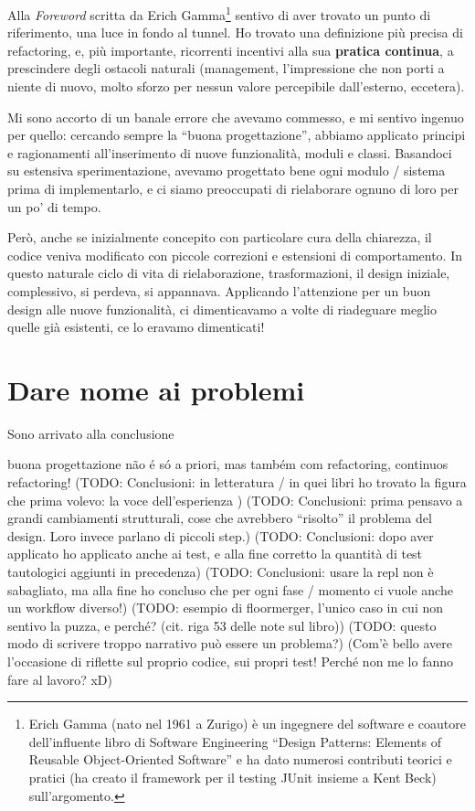 \documentclass[12pt]{report}
\begin{document}
Alla \textit{Foreword} scritta da Erich Gamma\footnote{
Erich Gamma (nato nel 1961 a Zurigo) è un ingegnere del software e
coautore dell'influente libro di Software Engineering ``Design Patterns: 
Elements of Reusable Object-Oriented Software'' e ha dato numerosi contributi
teorici e pratici (ha creato il framework per il testing JUnit insieme
a Kent Beck) sull'argomento.}
sentivo di aver trovato un punto di 
riferimento, una luce in fondo al tunnel. Ho trovato una definizione più precisa
di refactoring, e, più importante, ricorrenti incentivi alla sua 
\textbf{pratica continua}, a prescindere degli ostacoli naturali (management, 
l'impressione che non porti a niente di nuovo, molto sforzo per nessun valore
percepibile dall'esterno, eccetera).

Mi sono accorto di un banale errore che avevamo commesso, e mi 
sentivo ingenuo per quello: cercando sempre la ``buona progettazione'', 
abbiamo applicato principi e ragionamenti all'inserimento di nuove 
funzionalità, moduli e classi. Basandoci su estensiva sperimentazione, 
avevamo progettato bene ogni modulo / sistema prima di implementarlo, e ci
siamo preoccupati di rielaborare ognuno di loro per un po' di tempo.

Però, anche se inizialmente concepito con particolare cura della chiarezza, 
il codice veniva modificato con piccole correzioni e estensioni di 
comportamento. In questo naturale ciclo di vita di rielaborazione, 
trasformazioni, il design iniziale, complessivo, si perdeva, si appannava. 
Applicando l'attenzione per un buon design alle nuove funzionalità, ci 
dimenticavamo a volte di riadeguare meglio quelle già esistenti, ce lo 
eravamo dimenticati!

\section*{Dare nome ai problemi}

Sono arrivato alla conclusione


buona progettazione não é só a priori, mas também com refactoring, continuos refactoring!
(TODO: Conclusioni: in letteratura / in quei libri ho trovato la figura che prima volevo: la voce dell'esperienza )
(TODO: Conclusioni: prima pensavo a grandi cambiamenti strutturali, cose che avrebbero ``risolto'' il problema del design. Loro invece parlano di piccoli step.)
(TODO: Conclusioni: dopo aver applicato ho applicato anche ai test, e alla fine corretto la quantità di test tautologici aggiunti in precedenza)
(TODO: Conclusioni: usare la repl non è sabagliato, ma alla fine ho concluso che per ogni fase / momento ci vuole anche un workflow diverso!)
(TODO: esempio di floormerger, l'unico caso in cui non sentivo la puzza, e perché? (cit. riga 53 delle note sul libro))
(TODO: questo modo di scrivere troppo narrativo può essere un problema?)
(Com'è bello avere l'occasione di riflette sul proprio codice, sui propri test! Perché non me lo fanno fare al lavoro? xD)
%
\end{document}
